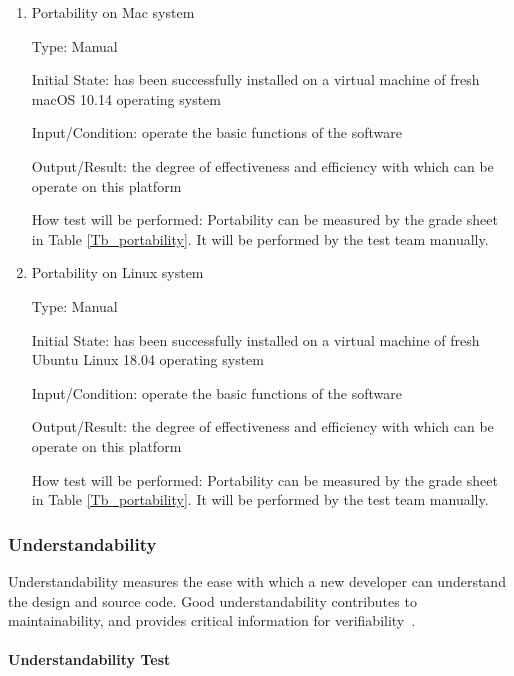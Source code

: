 \documentclass[12pt, titlepage]{article}
\begin{document}
\begin{enumerate}
\item{Portability on Mac system}

Type: Manual
					
Initial State: \progname{} has been successfully installed on a virtual machine
of fresh macOS 10.14 operating system
					
Input/Condition: operate the basic functions of the software
					
Output/Result: the degree of effectiveness and efficiency
with which \progname{} can be operate on this platform
					
How test will be performed: Portability can be measured by the grade sheet in
Table \ref{Tb_portability}. It will be performed by the test team manually.

\item{Portability on Linux system}

Type: Manual
					
Initial State: \progname{} has been successfully installed on a virtual machine
of fresh Ubuntu Linux 18.04 operating system
					
Input/Condition: operate the basic functions of the software
					
Output/Result: the degree of effectiveness and efficiency
with which \progname{} can be operate on this platform
					
How test will be performed: Portability can be measured by the grade sheet in
Table \ref{Tb_portability}. It will be performed by the test team manually.
\end{enumerate}

\subsubsection{Understandability}
\label{sec_understandtest}

Understandability measures the ease with which a new developer can understand
the design and source code. Good understandability contributes to
maintainability, and provides critical information for
verifiability~\cite{SmithEtAl2018}.

\paragraph{Understandability Test}
\end{document}
